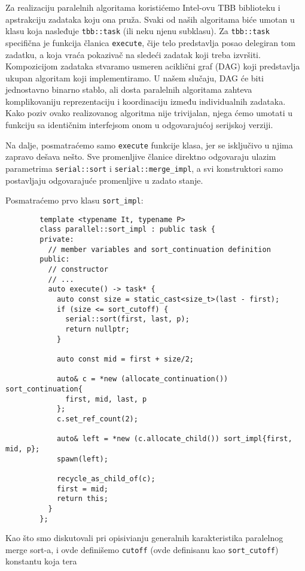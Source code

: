 \documentclass[a4paper,11pt]{article}
\begin{document}
    Za realizaciju paralelnih algoritama koristićemo Intel-ovu TBB biblioteku i apstrakciju zadataka koju
    ona pruža. Svaki od naših algoritama biće umotan u klasu koja nasleđuje \verb|tbb::task| (ili neku njenu subklasu).
    Za \verb|tbb::task| specifična je funkcija članica \verb|execute|, čije telo predstavlja posao delegiran
    tom zadatku, a koja vraća pokazivač na sledeći zadatak koji treba izvršiti. Kompozicijom zadataka stvaramo
    usmeren aciklični graf (DAG) koji predstavlja ukupan algoritam koji implementiramo. U našem slučaju, DAG će
    biti jednostavno binarno stablo, ali dosta paralelnih algoritama zahteva komplikovaniju reprezentaciju
    i koordinaciju između individualnih zadataka.
    Kako poziv ovako realizovanog algoritma nije trivijalan, njega ćemo umotati u funkciju sa identičnim interfejsom
    onom u odgovarajućoj serijskoj verziji.\par
    Na dalje, posmatraćemo samo \verb|execute| funkcije klasa, jer se isključivo u njima zapravo dešava nešto. Sve
    promenljive članice direktno odgovaraju ulazim parametrima \verb|serial::sort| i \verb|serial::merge_impl|, a svi
    konstruktori samo postavljaju odgovarajuće promenljive u zadato stanje.\par
    Posmatraćemo prvo klasu \verb|sort_impl|:
    \begin{verbatim}
        template <typename It, typename P>
        class parallel::sort_impl : public task {
        private:
          // member variables and sort_continuation definition
        public:
          // constructor
          // ...
          auto execute() -> task* {
            auto const size = static_cast<size_t>(last - first);
            if (size <= sort_cutoff) {
              serial::sort(first, last, p);
              return nullptr;
            }

            auto const mid = first + size/2;

            auto& c = *new (allocate_continuation()) sort_continuation{
              first, mid, last, p
            };
            c.set_ref_count(2);

            auto& left = *new (c.allocate_child()) sort_impl{first, mid, p};
            spawn(left);

            recycle_as_child_of(c);
            first = mid;
            return this;
          }
        };
    \end{verbatim}
    Kao što smo diskutovali pri opisivianju generalnih karakteristika paralelnog merge sort-a,
    i ovde definišemo \verb|cutoff| (ovde definisanu kao \verb|sort_cutoff|) konstantu koja tera
\end{document}
